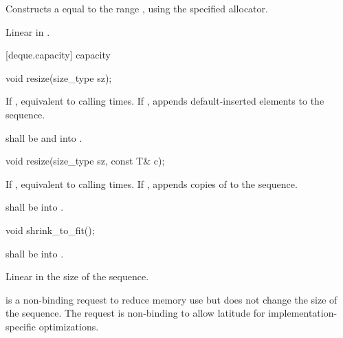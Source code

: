 \begin{itemdescr}
\pnum
\effects
Constructs a
equal to the range
,
using the specified allocator.

\pnum
\complexity Linear in .
\end{itemdescr}

[deque.capacity]{ capacity}

%
\begin{itemdecl}
void resize(size_type sz);
\end{itemdecl}

\begin{itemdescr}
\pnum
\effects If , equivalent to calling
  times.
If ,
appends  default-inserted elements to the
sequence.

\pnum
\requires {} shall be  and  into .
\end{itemdescr}

%
\begin{itemdecl}
void resize(size_type sz, const T& c);
\end{itemdecl}

\begin{itemdescr}
\pnum
\effects If , equivalent to calling
  times. If ,
appends  copies of  to the sequence.

\pnum
\requires {} shall be
 into .
\end{itemdescr}

%
%
\begin{itemdecl}
void shrink_to_fit();
\end{itemdecl}

\begin{itemdescr}
\pnum
\requires {} shall be  into .

\pnum
\complexity Linear in the size of the sequence.

\pnum
\remarks {} is a non-binding request to reduce memory use
but does not change the size of the sequence. \enternote The request is non-binding to allow latitude for implementation-specific optimizations. \exitnote
\end{itemdescr}

